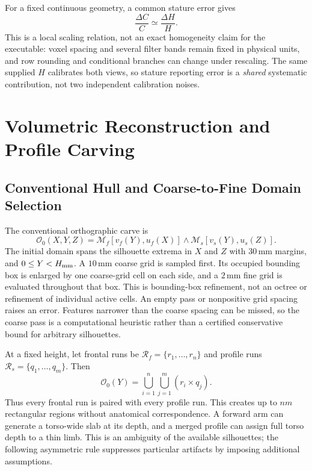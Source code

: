 \documentclass[11pt,a4paper]{article}
\numberwithin{equation}{section}
\begin{document}
For a fixed continuous geometry, a common stature error gives
\begin{equation}
\frac{\Delta C}{C}\simeq\frac{\Delta H}{H}.
\label{eq:scale_prop}
\end{equation}
This is a local scaling relation, not an exact homogeneity claim for the executable: voxel spacing and several filter bands remain fixed in physical units, and row rounding and conditional branches can change under rescaling. The same supplied $H$ calibrates both views, so stature reporting error is a \emph{shared} systematic contribution, not two independent calibration noises.

\section{Volumetric Reconstruction and Profile Carving}
\subsection{Conventional Hull and Coarse-to-Fine Domain Selection}
\label{subsec:carving}
The conventional orthographic carve is
\begin{equation}
\mathcal O_0(X,Y,Z)=\mathcal M_f[v_f(Y),u_f(X)]\wedge\mathcal M_s[v_s(Y),u_s(Z)].
\label{eq:cartesian_carve}
\end{equation}
The initial domain spans the silhouette extrema in $X$ and $Z$ with $30$\,mm margins, and $0\le Y<H_{\rm mm}$. A $10$\,mm coarse grid is sampled first. Its occupied bounding box is enlarged by one coarse-grid cell on each side, and a $2$\,mm fine grid is evaluated throughout that box. This is bounding-box refinement, not an octree or refinement of individual active cells. An empty pass or nonpositive grid spacing raises an error. Features narrower than the coarse spacing can be missed, so the coarse pass is a computational heuristic rather than a certified conservative bound for arbitrary silhouettes.

At a fixed height, let frontal runs be $\mathcal R_f=\{r_1,\ldots,r_n\}$ and profile runs $\mathcal R_s=\{q_1,\ldots,q_m\}$. Then
\begin{equation}
\mathcal O_0(Y)=\bigcup_{i=1}^n\bigcup_{j=1}^m(r_i\times q_j).
\end{equation}
Thus every frontal run is paired with every profile run. This creates up to $nm$ rectangular regions without anatomical correspondence. A forward arm can generate a torso-wide slab at its depth, and a merged profile can assign full torso depth to a thin limb. This is an ambiguity of the available silhouettes; the following asymmetric rule suppresses particular artifacts by imposing additional assumptions.
\end{document}
